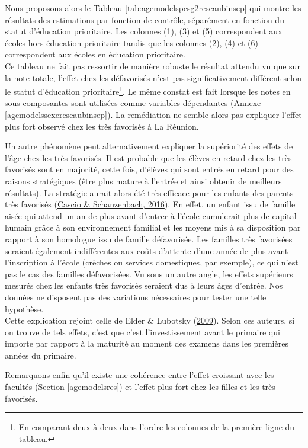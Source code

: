 \documentclass[
]{book}
\begin{document}
\quad Nous proposons alors le Tableau \ref{tab:agemodelspcsg2reseaubinsep} qui montre les résultats des estimations par fonction de contrôle, séparément en fonction du statut d'éducation prioritaire. Les colonnes (1), (3) et (5) correspondent aux écoles hors éducation prioritaire tandis que les colonnes (2), (4) et (6) correspondent aux écoles en éducation prioritaire.\\
Ce tableau ne fait pas ressortir de manière robuste le résultat attendu vu que sur la note totale, l'effet chez les défavorisés n'est pas significativement différent selon le statut d'éducation prioritaire\footnote{En comparant deux à deux dans l'ordre les colonnes de la première ligne du tableau.}.
Le même constat est fait lorsque les notes en sous-composantes sont utilisées comme variables dépendantes (Annexe \ref{agemodelssexereseaubinsep}).
La remédiation ne semble alors pas expliquer l'effet plus fort observé chez les très favorisés à La Réunion.

\quad Un autre phénomène peut alternativement expliquer la supériorité des effets de l'âge chez les très favorisés. Il est probable que les élèves en retard chez les très favorisés sont en majorité, cette fois, d'élèves qui sont entrés en retard pour des raisons stratégiques (être plus mature à l'entrée et ainsi obtenir de meilleurs résultats). La stratégie aurait alors été très efficace pour les enfants des parents très favorisés (\protect\hyperlink{ref-CAS:SCH:16}{Cascio \& Schanzenbach, 2016}). En effet, un enfant issu de famille aisée qui attend un an de plus avant d'entrer à l'école cumulerait plus de capital humain grâce à son environnement familial et les moyens mis à sa disposition par rapport à son homologue issu de famille défavorisée. Les familles très favorisées seraient également indifférentes aux coûts d'attente d'une année de plus avant l'inscription à l'école (crèches ou services domestiques, par exemple), ce qui n'est pas le cas des familles défavorisées. Vu sous un autre angle, les effets supérieurs mesurés chez les enfants très favorisés seraient dus à leurs âges d'entrée. Nos données ne disposent pas des variations nécessaires pour tester une telle hypothèse.\\
Cette explication rejoint celle de Elder \& Lubotsky (\protect\hyperlink{ref-ELD:LUB:09}{2009}). Selon ces auteurs, si on trouve de tels effets, c'est que c'est l'investissement avant le primaire qui importe par rapport à la maturité au moment des examens dans les premières années du primaire.

\quad Remarquons enfin qu'il existe une cohérence entre l'effet croissant avec les facultés (Section \ref{agemodelsres}) et l'effet plus fort chez les filles et les très favorisés.
\end{document}

